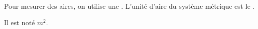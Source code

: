 Pour mesurer des aires, on utilise une . L'unité
d'aire du système métrique est le .\par\noindent
Il est noté $m^2$.